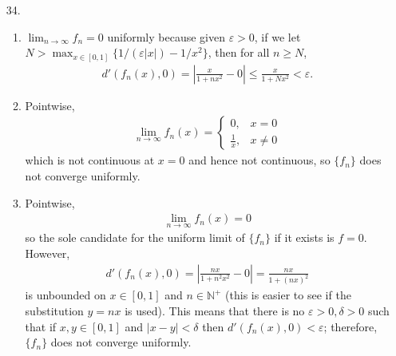 \documentclass[a4paper,12pt]{article}
\begin{document}
\begin{enumerate}
        \item[34.]
            \begin{enumerate}
                \item
                    $\lim_{n \to \infty} f_n = 0$ uniformly because given $\varepsilon > 0$, if we let $N > \max_{x \in [0, 1]}\{ 1 / (\varepsilon|x|) - 1 / x^2 \}$, then for all $n \geq N$,
                    \begin{align*}
                        d'(f_n(x), 0) = \left| \frac{x}{1 + nx^2} - 0 \right| \leq \frac{x}{1 + Nx^2} < \varepsilon.
                    \end{align*}

                \item
                    Pointwise,
                    \begin{align*}
                        \lim_{n \to \infty} f_n(x) = \begin{cases}
                            0, &x = 0 \\
                            \frac{1}{x}, &x \neq 0
                        \end{cases}
                    \end{align*}
                    which is not continuous at $x = 0$ and hence not continuous, so $\{ f_n \}$ does not converge uniformly.

                \item
                    Pointwise,
                    \begin{align*}
                        \lim_{n \to \infty} f_n(x) = 0
                    \end{align*}
                    so the sole candidate for the uniform limit of $\{ f_n \}$ if it exists is $f = 0$. However,
                    \begin{align*}
                        d'(f_n(x), 0) = \left| \frac{nx}{1 + n^2x^2} - 0 \right| = \frac{nx}{1 + (nx)^2}
                    \end{align*}
                    is unbounded on $x \in [0, 1]$ and $n \in \mathbb{N}^+$ (this is easier to see if the substitution $y = nx$ is used). This means that there is no $\varepsilon > 0, \delta > 0$ such that if $x, y \in [0, 1]$ and $|x - y| < \delta$ then $d'(f_n(x), 0) < \varepsilon$; therefore, $\{ f_n \}$ does not converge uniformly.

            \end{enumerate}


\end{enumerate}
\end{document}
